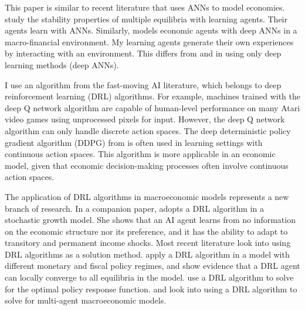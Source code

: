 \documentclass[hidelinks]{article}
\begin{document}


This paper is similar to recent literature that uses ANNs to model economies. \cite{ashwin2021unattractiveness} study the stability properties of multiple equilibria with learning agents. Their agents learn with ANNs. Similarly, \cite{kuriksha2021economy} models economic agents with deep ANNs in a macro-financial environment. My learning agents generate their own experiences by interacting with an environment. This differs from \cite{ashwin2021unattractiveness} and \cite{kuriksha2021economy} in using only deep learning methods (deep ANNs).

I use an algorithm from the fast-moving AI literature, which belongs to deep reinforcement learning (DRL) algorithms. For example, machines trained with the deep Q network algorithm \citep{mnih-atari-2013} are capable of human-level performance on many Atari video games using unprocessed pixels for input. However, the deep Q network algorithm can only handle discrete action spaces. The deep deterministic policy gradient algorithm (DDPG) from \cite{lillicrap2015drl} is often used in learning settings with continuous action spaces. This algorithm is more applicable in an economic model, given that economic decision-making processes often involve continuous action spaces.

The application of DRL algorithms in macroeconomic models represents a new branch of research. In a companion paper, \cite{Shi2021learning} adopts a DRL algorithm in a stochastic growth model. She shows that an AI agent learns from no information on the economic structure nor its preference, and it has the ability to adapt to transitory and permanent income shocks. Most recent literature look into using DRL algorithms as a solution method. \cite{Shi2021deep} apply a DRL algorithm in a model with different monetary and fiscal policy regimes, and show evidence that a DRL agent can locally converge to all equilibria in the model. \cite{Hinterlangand2021} use a DRL algorithm to solve for the optimal policy response function. \cite{https://doi.org/10.48550/arxiv.2103.16977} and \cite{https://doi.org/10.48550/arxiv.2201.01163} look into using a DRL algorithm to solve for multi-agent macroeconomic models.  
\end{document}
